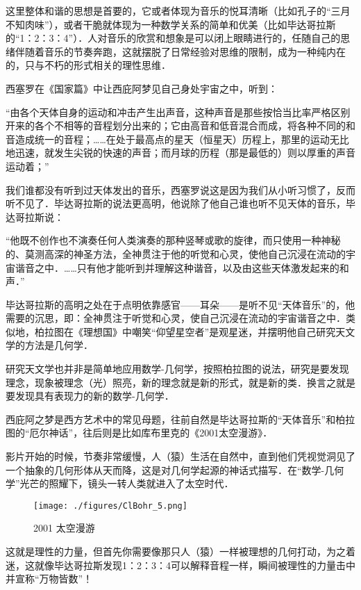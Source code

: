 这里整体和谐的思想是首要的，它或者体现为音乐的悦耳清晰（比如孔子的“三月不知肉味”），或者干脆就体现为一种数学关系的简单和优美（比如毕达哥拉斯的“1：2：3：4”）．人对音乐的欣赏和想象是可以闭上眼睛进行的，任随自己的思绪伴随着音乐的节奏奔跑，这就摆脱了日常经验对思维的限制，成为一种纯内在的，只与不朽的形式相关的理性思维．

西塞罗在《国家篇》中让西庇阿梦见自己身处宇宙之中，听到：

“由各个天体自身的运动和冲击产生出声音，这种声音是那些按恰当比率严格区别开来的各个不相等的音程划分出来的；它由高音和低音混合而成，将各种不同的和音造成统一的音程；……在处于最高点的星天（恒星天）历程上，那里的运动无比地迅速，就发生尖锐的快速的声音；而月球的历程（那是最低的）则以厚重的声音运动着；”

我们谁都没有听到过天体发出的音乐，西塞罗说这是因为我们从小听习惯了，反而听不见了．毕达哥拉斯的说法更高明，他说除了他自己谁也听不见天体的音乐，毕达哥拉斯说：

“他既不创作也不演奏任何人类演奏的那种竖琴或歌的旋律，而只使用一种神秘的、莫测高深的神圣方法，全神贯注于他的听觉和心灵，使他自己沉浸在流动的宇宙谐音之中．……只有他才能听到并理解这种谐音，以及由这些天体激发起来的和声．”

毕达哥拉斯的高明之处在于点明依靠感官——耳朵——是听不见“天体音乐”的，他需要的沉思，即：全神贯注于听觉和心灵，使自己沉浸在流动的宇宙谐音之中．类似地，柏拉图在《理想国》中嘲笑“仰望星空者”是观星迷，并摆明他自己研究天文学的方法是几何学．

研究天文学也并非是简单地应用数学-几何学，按照柏拉图的说法，研究是要发现理念，现象被理念（光）照亮，新的理念就是新的形式，就是新的类．换言之就是要发现具有表现力的新的数学-几何学．

西庇阿之梦是西方艺术中的常见母题，往前自然是毕达哥拉斯的“天体音乐”和柏拉图的“厄尔神话”，往后则是比如库布里克的《2001太空漫游》．

影片开始的时候，节奏非常缓慢，人（猿）生活在自然中，直到他们凭视觉洞见了一个抽象的几何形体从天而降，这是对几何学起源的神话式描写．在“数学-几何学”光芒的照耀下，镜头一转人类就进入了太空时代．

\begin{figure}[ht]
\centering
\texttt{[image: ./figures/ClBohr\_5.png]}
\caption{2001 太空漫游} \label{ClBohr_fig5}
\end{figure}


这就是理性的力量，但首先你需要像那只人（猿）一样被理想的几何打动，为之着迷，这就像毕达哥拉斯发现1：2：3：4可以解释音程一样，瞬间被理性的力量击中并宣称“万物皆数”！

